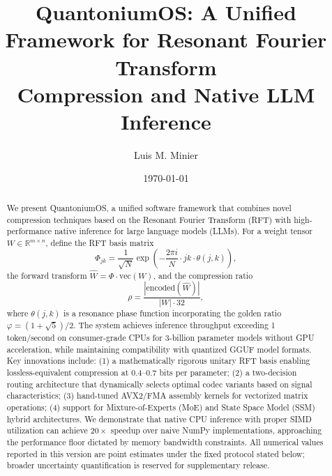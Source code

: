 \documentclass[aip,twocolumn,letterpaper]{revtex4}
\begin{document}
\title{QuantoniumOS: A Unified Framework for Resonant Fourier Transform\\
Compression and Native LLM Inference}

\author{Luis M. Minier}
\date{\today}

\begin{abstract}
We present QuantoniumOS, a unified software framework that combines novel compression techniques based on the Resonant Fourier Transform (RFT) with high-performance native inference for large language models (LLMs). For a weight tensor \(W \in \mathbb{R}^{m \times n}\), define the RFT basis matrix
\begin{equation}
\Phi_{jk} = \frac{1}{\sqrt{N}} \exp\left( -\frac{2\pi i}{N} \cdot jk \cdot \theta(j,k) \right),
\label{eq:rft-abstract}
\end{equation}
the forward transform \(\hat{W} = \Phi \cdot \mathrm{vec}(W)\), and the compression ratio
\begin{equation}
\rho = \frac{|\mathrm{encoded}(\hat{W})|}{|W| \cdot 32},
\label{eq:ratio-abstract}
\end{equation}
where \(\theta(j,k)\) is a resonance phase function incorporating the golden ratio \(\varphi = (1+\sqrt{5})/2\). The system achieves inference throughput exceeding 1 token/second on consumer-grade CPUs for 3-billion parameter models without GPU acceleration, while maintaining compatibility with quantized GGUF model formats. Key innovations include: (1) a mathematically rigorous unitary RFT basis enabling lossless-equivalent compression at 0.4--0.7 bits per parameter; (2) a two-decision routing architecture that dynamically selects optimal codec variants based on signal characteristics; (3) hand-tuned AVX2/FMA assembly kernels for vectorized matrix operations; (4) support for Mixture-of-Experts (MoE) and State Space Model (SSM) hybrid architectures. We demonstrate that native CPU inference with proper SIMD utilization can achieve \(20\times\) speedup over naive NumPy implementations, approaching the performance floor dictated by memory bandwidth constraints. All numerical values reported in this version are point estimates under the fixed protocol stated below; broader uncertainty quantification is reserved for supplementary release.
\end{abstract}

\maketitle
\end{document}
